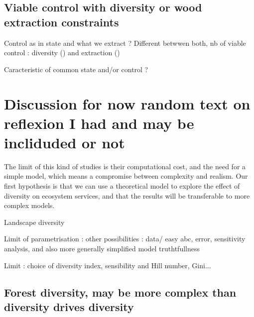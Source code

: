 \documentclass{article}
\begin{document}
\subsection{Viable control with diversity or wood extraction constraints}

Control as in state and what we extract ?
Different betwwen both, nb of viable control : diversity () and extraction ()

Caracteristic of common state and/or control ?\\

\section{Discussion for now random text on reflexion I had and may be incliduded or not}

The limit of this kind of studies is their computational cost, and the need for a simple model, which means a compromise between complexity and realism. Our first hypothesis is that we can use a theoretical model to explore the effect of diversity on ecosystem services, and that the results will be transferable to more complex models.

Landscape diversity

Limit of parametrisation : other possibilities : data/ easy abc, error, sensitivity analysis, and also more generally simplified model truthtfullness

Limit : choice of diversity index, sensibility and Hill number, Gini...

\subsection{Forest diversity, may be more complex than diversity drives diversity}
\end{document}
